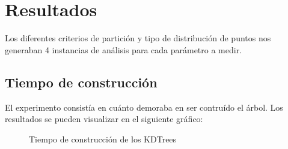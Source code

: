 \documentclass[12pt,letterpaper, margin = 3cm]{article}
\begin{document}
\newpage
\section{Resultados}
Los diferentes criterios de partición y tipo de distribución de puntos nos generaban 4 instancias de análisis para cada parámetro a medir.

\subsection{Tiempo de construcción}
El experimento consistía en cuánto demoraba en ser contruído el árbol. Los resultados se pueden visualizar en el siguiente gráfico:

\begin{figure}[ht!]
 \centering
{}
 \caption{Tiempo de construcción de los KDTrees}
\end{figure}
\end{document}
